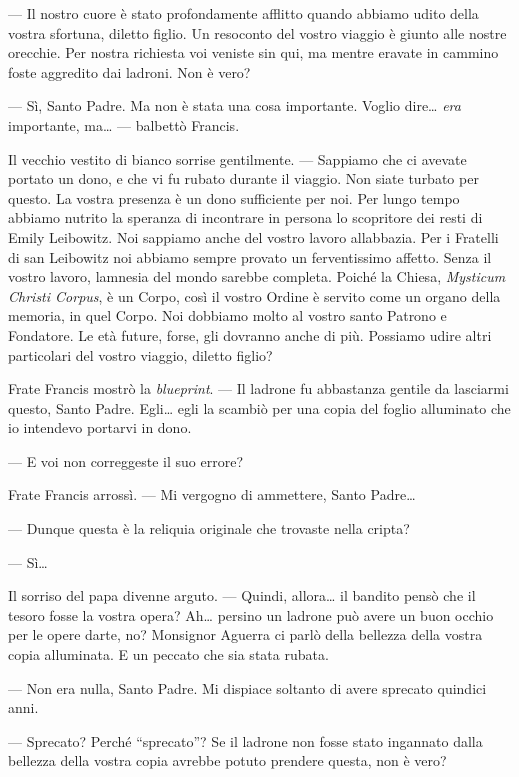 --- Il nostro cuore è stato profondamente afflitto quando abbiamo udito
della vostra sfortuna, diletto figlio. Un resoconto del vostro viaggio è
giunto alle nostre orecchie. Per nostra richiesta voi veniste sin qui,
ma mentre eravate in cammino foste aggredito dai ladroni. Non è vero?

--- Sì, Santo Padre. Ma non è stata una cosa importante. Voglio
dire\ldots{} \emph{era} importante, ma\ldots{} --- balbettò Francis.

Il vecchio vestito di bianco sorrise gentilmente. --- Sappiamo che ci
avevate portato un dono, e che vi fu rubato durante il viaggio. Non
siate turbato per questo. La vostra presenza è un dono sufficiente per
noi. Per lungo tempo abbiamo nutrito la speranza di incontrare in
persona lo scopritore dei resti di Emily Leibowitz. Noi sappiamo anche
del vostro lavoro all\textquotesingle abbazia. Per i Fratelli di san
Leibowitz noi abbiamo sempre provato un ferventissimo affetto. Senza il
vostro lavoro, l\textquotesingle amnesia del mondo sarebbe completa.
Poiché la Chiesa, \emph{Mysticum Christi Corpus}, è un Corpo, così il
vostro Ordine è servito come un organo della memoria, in quel Corpo. Noi
dobbiamo molto al vostro santo Patrono e Fondatore. Le età future,
forse, gli dovranno anche di più. Possiamo udire altri particolari del
vostro viaggio, diletto figlio?

Frate Francis mostrò la \emph{blueprint}. --- Il ladrone fu abbastanza
gentile da lasciarmi questo, Santo Padre. Egli\ldots{} egli la scambiò
per una copia del foglio alluminato che io intendevo portarvi in dono.

--- E voi non correggeste il suo errore?

Frate Francis arrossì. --- Mi vergogno di ammettere, Santo Padre\ldots{}

--- Dunque questa è la reliquia originale che trovaste nella cripta?

--- Sì\ldots{}

Il sorriso del papa divenne arguto. --- Quindi, allora\ldots{} il
bandito pensò che il tesoro fosse la vostra opera? Ah\ldots{} persino un
ladrone può avere un buon occhio per le opere d\textquotesingle arte,
no? Monsignor Aguerra ci parlò della bellezza della vostra copia
alluminata. E un peccato che sia stata rubata.

--- Non era nulla, Santo Padre. Mi dispiace soltanto di avere sprecato
quindici anni.

--- Sprecato? Perché ``sprecato''? Se il ladrone non fosse stato
ingannato dalla bellezza della vostra copia avrebbe potuto prendere
questa, non è vero?

